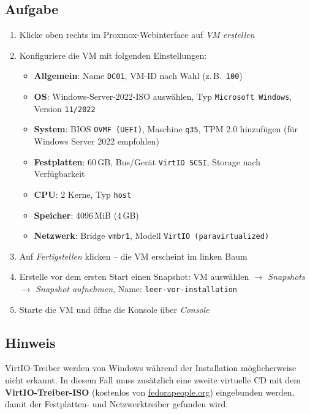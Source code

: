 \documentclass[11pt, oneside, numbers=noenddot]{scrbook}
\begin{document}
\subsection*{Aufgabe}
\begin{enumerate}
  \item Klicke oben rechts im Proxmox-Webinterface auf \textit{VM erstellen}
  \item Konfiguriere die VM mit folgenden Einstellungen:
  \begin{itemize}
    \item \textbf{Allgemein}: Name \texttt{DC01}, VM-ID nach Wahl (z.\,B.\ \texttt{100})
    \item \textbf{OS}: Windows-Server-2022-ISO auswählen, Typ \texttt{Microsoft Windows}, Version \texttt{11/2022}
    \item \textbf{System}: BIOS \texttt{OVMF (UEFI)}, Maschine \texttt{q35}, TPM 2.0 hinzufügen (für Windows Server 2022 empfohlen)
    \item \textbf{Festplatten}: 60\,GB, Bus/Gerät \texttt{VirtIO SCSI}, Storage nach Verfügbarkeit
    \item \textbf{CPU}: 2 Kerne, Typ \texttt{host}
    \item \textbf{Speicher}: 4096\,MiB (4\,GB)
    \item \textbf{Netzwerk}: Bridge \texttt{vmbr1}, Modell \texttt{VirtIO (paravirtualized)}
  \end{itemize}
  \item Auf \textit{Fertigstellen} klicken -- die VM erscheint im linken Baum
  \item Erstelle vor dem ersten Start einen Snapshot: VM auswählen $\rightarrow$ \textit{Snapshots} $\rightarrow$ \textit{Snapshot aufnehmen}, Name: \texttt{leer-vor-installation}
  \item Starte die VM und öffne die Konsole über \textit{Console}
\end{enumerate}

\subsection*{Hinweis}
VirtIO-Treiber werden von Windows während der Installation möglicherweise nicht erkannt. In diesem Fall muss zusätzlich eine zweite virtuelle CD mit dem \textbf{VirtIO-Treiber-ISO} (kostenlos von \href{https://fedorapeople.org/groups/virt/virtio-win/direct-downloads/stable-virtio/}{fedorapeople.org}) eingebunden werden, damit der Festplatten- und Netzwerktreiber gefunden wird.
\end{document}
